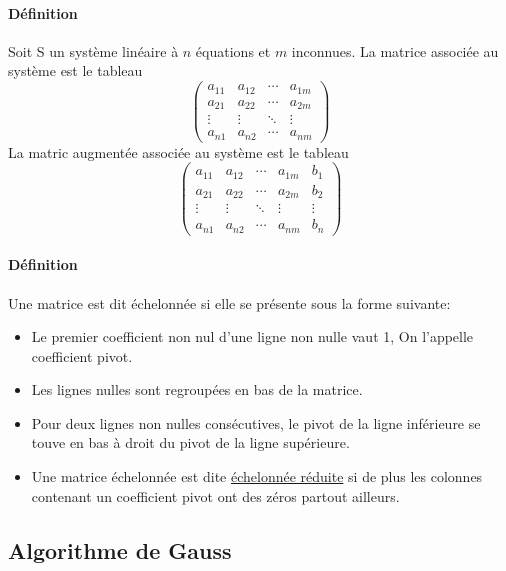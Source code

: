 \paragraph{Définition} Soit S un système linéaire à $n$ équations et $m$ inconnues. La matrice associée au système est le tableau
$$\begin{pmatrix}
  a_{11} & a_{12} & \cdots & a_{1m} \\
  a_{21} & a_{22} & \cdots & a_{2m} \\
  \vdots  & \vdots  & \ddots & \vdots  \\
  a_{n1} & a_{n2} & \cdots & a_{nm}
 \end{pmatrix}$$
La matric augmentée associée au système est le tableau
$$\begin{pmatrix}
  a_{11} & a_{12} & \cdots & a_{1m} & b_{1} \\
  a_{21} & a_{22} & \cdots & a_{2m} & b_{2} \\
  \vdots  & \vdots  & \ddots & \vdots & \vdots  \\
  a_{n1} & a_{n2} & \cdots & a_{nm} & b_{n}
 \end{pmatrix}$$
 
\paragraph{Définition} Une matrice est dit échelonnée si elle se présente sous la forme suivante:
\begin{itemize}
  \item Le premier coefficient non nul d'une ligne non nulle vaut 1, On l'appelle coefficient pivot.
  \item Les lignes nulles sont regroupées en bas de la matrice.
  \item Pour deux lignes non nulles consécutives, le pivot de la ligne inférieure se touve en bas à droit du pivot de la ligne supérieure.
  \item Une matrice échelonnée est dite \underline{échelonnée réduite} si de plus les colonnes contenant un coefficient pivot ont des zéros partout ailleurs.
\end{itemize}

%
\subsection{Algorithme de Gauss}
%
